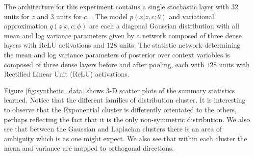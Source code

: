 \documentclass{article} %
\begin{document}
 The architecture for this experiment contains a single stochastic layer with $32$ units for $z$ and $3$ units for $c$, . The model $p(x | z,c ; \theta)$ and variational approximation $q(z | x,c ; \phi)$ are each a diagonal Gaussian distribution with all mean and log variance parameters given by a network composed of three dense layers with ReLU activations and $128$ units. The statistic network determining the mean and log variance parameters of posterior over context variables is composed of three dense layers before and after pooling, each with $128$ units with Rectified Linear Unit (ReLU) activations.
 
Figure \ref{fig:synthetic_data}  shows  3-D scatter plots of the summary statistics learned. Notice that the different families of distribution cluster. It is interesting to observe that the Exponential cluster is differently orientated to the others, perhaps reflecting the fact that it is the only non-symmetric distribution. We also see that between the Gaussian and Laplacian clusters there is an area of ambiguity which is as one might expect. We also see that within each cluster the mean and variance are mapped to orthogonal directions.
\end{document}
